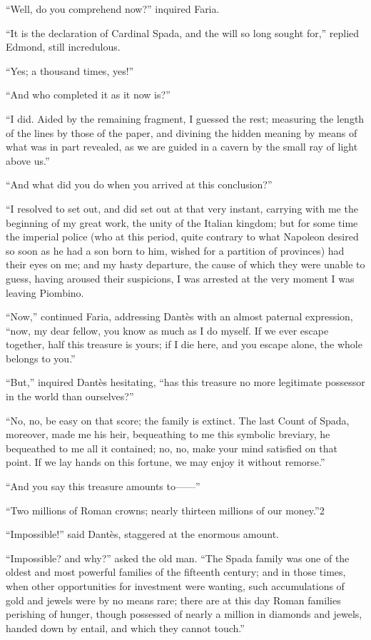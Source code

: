 “Well, do you comprehend now?” inquired Faria.

“It is the declaration of Cardinal Spada, and the will so long sought
for,” replied Edmond, still incredulous.

“Yes; a thousand times, yes!”

“And who completed it as it now is?”

“I did. Aided by the remaining fragment, I guessed the rest; measuring
the length of the lines by those of the paper, and divining the hidden
meaning by means of what was in part revealed, as we are guided in a
cavern by the small ray of light above us.”

“And what did you do when you arrived at this conclusion?”

“I resolved to set out, and did set out at that very instant, carrying
with me the beginning of my great work, the unity of the Italian
kingdom; but for some time the imperial police (who at this period,
quite contrary to what Napoleon desired so soon as he had a son born to
him, wished for a partition of provinces) had their eyes on me; and my
hasty departure, the cause of which they were unable to guess, having
aroused their suspicions, I was arrested at the very moment I was
leaving Piombino.

“Now,” continued Faria, addressing Dantès with an almost paternal
expression, “now, my dear fellow, you know as much as I do myself. If
we ever escape together, half this treasure is yours; if I die here,
and you escape alone, the whole belongs to you.”

“But,” inquired Dantès hesitating, “has this treasure no more
legitimate possessor in the world than ourselves?”

“No, no, be easy on that score; the family is extinct. The last Count
of Spada, moreover, made me his heir, bequeathing to me this symbolic
breviary, he bequeathed to me all it contained; no, no, make your mind
satisfied on that point. If we lay hands on this fortune, we may enjoy
it without remorse.”

“And you say this treasure amounts to——”

“Two millions of Roman crowns; nearly thirteen millions of our money.”2

“Impossible!” said Dantès, staggered at the enormous amount.

“Impossible? and why?” asked the old man. “The Spada family was one of
the oldest and most powerful families of the fifteenth century; and in
those times, when other opportunities for investment were wanting, such
accumulations of gold and jewels were by no means rare; there are at
this day Roman families perishing of hunger, though possessed of nearly
a million in diamonds and jewels, handed down by entail, and which they
cannot touch.”

